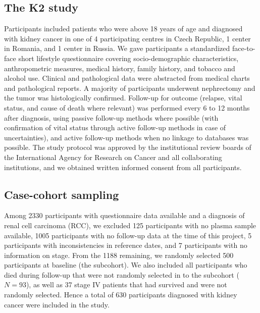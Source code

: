 \documentclass[a4paper,11pt]{article}
\begin{document}
\subsection*{The K2 study}
Participants included patients who were above 18 years of age and diagnosed 
with kidney cancer in one of 4 participating centres in Czech Republic, 1 
center in Romania, and 1 center in Russia. We gave 
participants a standardized face-to-face short lifestyle 
questionnaire covering socio-demographic characteristics, anthropometric 
measures, medical history, family history, and tobacco and alcohol use. 
Clinical and pathological data were abstracted from medical charts and 
pathological reports. A majority of participants underwent nephrectomy and the 
tumor was histologically confirmed. Follow-up for outcome (relapse, vital 
status, and cause of death where relevant) was performed every 6 to 12 months 
after diagnosis, using passive follow-up methods where possible (with 
confirmation of vital status through active follow-up methods in case of 
uncertainties), and active follow-up methods when no linkage to databases was 
possible. The study protocol was approved by the institutional review boards of the 
International Agency for Research on Cancer and all collaborating institutions, and 
we obtained written informed consent from all participants. 

\subsection*{Case-cohort sampling}
Among 2330 participants with questionnaire data available and a diagnosis of 
renal cell carcinoma (RCC), we excluded 125 participants 
with no plasma sample available, 1005 participants with no follow-up data at 
the time of this project, 5 participants with inconsistencies in reference 
dates, and 7 participants with no information on stage. From the 1188 
remaining, we randomly selected 500 participants at baseline (the subcohort). 
We also included all participants who died during follow-up that were not 
randomly selected in to the subcohort ($N=93$), as well as 37 stage IV patients 
that had survived and were not randomly selected. Hence a total of 
630 participants diagnosed with kidney cancer were included in the study.
\end{document}
